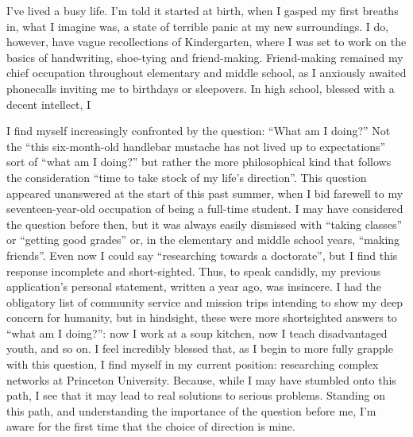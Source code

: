 I've lived a busy life. I'm told it started at birth, when I gasped my first breaths in, what I imagine was, a state of terrible panic at my new surroundings. I do, however, have vague recollections of Kindergarten, where I was set to work on the basics of handwriting, shoe-tying and friend-making. Friend-making remained my chief occupation throughout elementary and middle school, as I anxiously awaited phonecalls inviting me to birthdays or sleepovers. In high school, blessed with a decent intellect, I 

I find myself increasingly confronted by the question: ``What am I doing?'' Not the ``this six-month-old handlebar mustache has not lived up to expectations'' sort of  ``what am I doing?'' but rather the more philosophical kind that follows the consideration ``time to take stock of my life's direction''. This question appeared unanswered at the start of this past summer, when I bid farewell to my seventeen-year-old occupation of being a full-time student. I may have considered the question before then, but it was always easily dismissed with ``taking classes'' or ``getting good grades'' or, in the elementary and middle school years, ``making friends''. Even now I could say ``researching towards a doctorate'', but I find this response incomplete and short-sighted. Thus, to speak candidly, my previous application's personal statement, written a year ago, was insincere. I had the obligatory list of community service and mission trips intending to show my deep concern for humanity, but in hindsight, these were more shortsighted answers to ``what am I doing?'': now I work at a soup kitchen, now I teach disadvantaged youth, and so on. I feel incredibly blessed that, as I begin to more fully grapple with this question, I find myself in my current position: researching complex networks at Princeton University. Because, while I may have stumbled onto this path, I see that it may lead to real solutions to serious problems. Standing on this path, and understanding the importance of the question before me, I'm aware for the first time that the choice of direction is mine.
